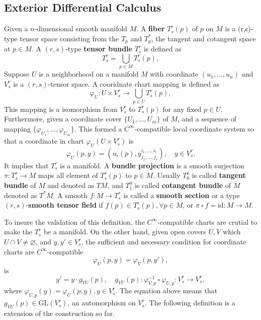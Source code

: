 \subsection{Exterior Differential Calculus}
\begin{definition}
Given a $n$-dimensional smooth manifold $M$. A \textbf{fiber} $T^r_s(p)$ of $p$ on $M$ is a (r,s)-type tensor space consisting from the $T_p$ and $T^*_p$, the tangent and cotangent space at $p\in M$. A $(r,s)$-type \textbf{tensor bundle} $T^r_s$ is defined as
\begin{equation}
T^r_s=\bigcup_{p\in M}T^r_s(p),
\end{equation}
Suppose $U$ is a neighborhood on a manifold $M$ with coordinate $(u_1,\dots,u_n)$ and $V^r_s$ is a $(r,s)$-tensor space. A cooridnate chart mapping is defined as
\begin{equation}
\varphi_U:U\times V^r_s\to \bigcup_{p\in U}T^r_s(p),
\end{equation}
This mapping is a isomorphism from $V^r_s$ to $T^r_s(p)$ for any fixed $p\in U$. Furthermore, given a coordinate cover $\{U_1,\dots,U_m\}$ of $M$, and a sequence of mapping $\{\varphi_{U_1},\dots,\varphi_{U_m}\}$. This formed a $C^\infty$-compatible local coordinate system so that a coordinate in chart $\varphi_U(U\times V^r_s)$ is
\begin{equation}
\varphi_U(p,y)=\left(u_i(p),y^{i_1,\dots,i_r}_{j_1,\dots,j_s}\right),\quad y\in V^r_s.
\end{equation}
It implies that $T^r_s$ is a manifold. A \textbf{bundle projection} is a smooth surjection $\pi:T^r_s\to M$ maps all element of $T^r_s(p)$ to $p\in M$. Usually $T^1_0$ is called \textbf{tangent bundle} of $M$ and denoted as $TM$, and $T_1^0$ is called \textbf{cotangent bundle} of $M$ denoted as $T^*M$.
A smooth $f:M\to T^r_s$ is called a \textbf{smooth section} or a type $(r,s)$-\textbf{smooth tensor field} if $f(p)\in T^r_s(p),\forall p\in M$, or $\pi\circ f=\text{id}:M\to M$.
\end{definition}


To insure the validation of this definition, the $C^\infty$-compatible charts are crutial to make the $T^r_s$ be a manifold. On the other hand, given open covers $U,V$ which $U\cap V\ne \varnothing$, and $y,y'\in V^r_s$, the sufficient and necessary condition for coordinate charts are $C^\infty$-compatible 
\begin{equation}
\varphi_U(p,y)=\varphi_V(p,y'),
\end{equation}
is
\begin{equation}
y'=y\cdot g_{VU}(p),\quad g_{VU}(p):\varphi^{-1}_{V,p}\circ\varphi_{U,p}:V^r_s\to V^r_s,
\end{equation}
where $\varphi_{U,p}(y) = \varphi_{U}(p,y),y\in V^r_s$. The equation above means that $g_{VU}(p)\in \text{GL}(V^r_s)$, an automorphism on $V^r_s$. The following definition is a extension of the construction so far.


